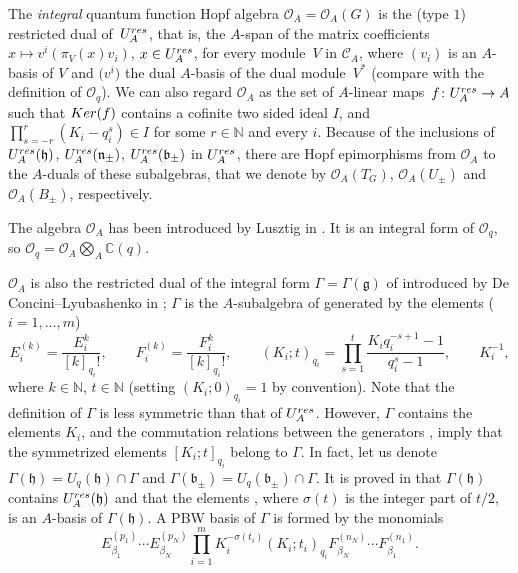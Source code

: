 \documentclass[11pt]{article}
\numberwithin{equation}{section}
\numberwithin{equation}{section}
\theoremstyle{definition}
\newcommand{\mc}{\mathbb{C}}
\newcommand{\mn}{\mathbb{N}}
\newcommand{\Oo}{{\mathcal O}}
\newcommand{\ra}{\rightarrow}
\begin{document}
The {\it integral} quantum function Hopf algebra $\Oo_A=\Oo_A(G)$ is the (type $1$) restricted dual of~$U_A^{\rm res}$, that is, the $A$-span of the matrix coefficients $x\mapsto v^i(\pi_V(x)v_i)$, $x\in U_A^{\rm res}$, for every module~$V$ in $\mathcal{C}_A$, where $(v_i)$ is an $A$-basis of $V$ and $\big(v^i\big)$ the dual $A$-basis of the dual module~$V^*$ (compare with the definition of $\Oo_q$). We can also regard $\Oo_A$ as the set of $A$-linear maps~${f\colon U_A^{\rm res}\ra A}$ such that ${\rm Ker}(f)$ contains a cofinite two sided ideal $I$, and $ \prod_{s=-r}^r (K_i - q_i^s) \in I$ for some $r\in \mathbb{N}$ and every $i$. Because of the inclusions of $U_A^{\rm res}(\mathfrak{h})$, $U_A^{\rm res}(\mathfrak{n}_\pm)$, $U_A^{\rm res}(\mathfrak{b}_\pm)$ in $U_A^{\rm res}$, there are Hopf epimorphisms from $\Oo_A$ to the $A$-duals of these subalgebras, that we denote by $\Oo_A(T_G)$, $\Oo_A(U_\pm)$ and $\Oo_A(B_\pm)$, respectively.

The algebra $\Oo_A$ has been introduced by Lusztig in \cite{Lusztig2,Lusztig}. It is an integral form of $\Oo_q$, so $\Oo_q = \Oo_A \bigotimes_A \mc(q)$.

$\Oo_A$ is also the restricted dual of the integral form $\Gamma=\Gamma(\mathfrak{g})$ of  introduced by De Concini--Lyubashenko in \cite[Sections 2 and~3]{DC-L}; $\Gamma$ is the $A$-subalgebra of  generated by the elements ($i=1,\dots,m$)
\[E_i^{(k)}= \frac{E_i^k}{[k]_{q_i}!} ,\qquad F_i^{(k)}= \frac{F_i^k}{[k]_{q_i}!} ,\qquad ( K_i; t )_{q_i}= \prod_{s=1}^t \frac{K_iq_i^{-s+1}-1}{q_i^s-1},\qquad K_i^{-1},\]
where $k\in \mn$, $t\in \mn$ (setting $( K_i; 0)_{q_i}=1$ by convention). Note that the definition of $\Gamma$ is less symmetric than that of $U_A^{\rm res}$. However, $\Gamma$ contains the elements $K_i$, and the commutation relations between the generators ,  imply that the symmetrized elements $[ K_i; t ]_{q_i}$ belong to $\Gamma$. In fact, let us denote $\Gamma(\mathfrak{h}) = U_q(\mathfrak{h}) \cap \Gamma$ and $\Gamma(\mathfrak{b}_\pm) = U_q(\mathfrak{b}_\pm) \cap \Gamma$. It is proved in \cite[Theorem 3.1]{DC-L} that $\Gamma(\mathfrak{h})$ contains $U_A^{\rm res}(\mathfrak{h})$ and that the elements \smash{$ \prod_{i=1}^m K_i^{-\sigma(t_i)}(K_i; t_i)_{q_i}$, $t_i\in \mn$}, where $\sigma(t)$ is the integer part of $t/2$, is an $A$-basis of $\Gamma(\mathfrak{h})$. A PBW basis of $\Gamma$ is formed by the monomials
\[%
E_{\beta_1}^{(p_1)}\cdots E_{\beta_N}^{(p_N)}\prod_{i=1}^m K_i^{-\sigma(t_i)}(K_i; t_i)_{q_i} F_{\beta_N}^{(n_N)}\cdots F_{\beta_1}^{(n_1)}.
\]
\end{document}
